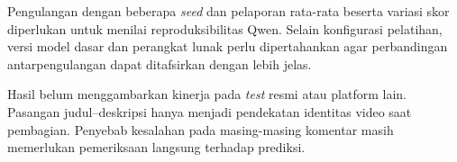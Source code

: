 \documentclass[11pt]{article}
\begin{document}
Pengulangan dengan beberapa \textit{seed} dan pelaporan rata-rata beserta variasi skor diperlukan untuk menilai reproduksibilitas Qwen. Selain konfigurasi pelatihan, versi model dasar dan perangkat lunak perlu dipertahankan agar perbandingan antarpengulangan dapat ditafsirkan dengan lebih jelas.

Hasil belum menggambarkan kinerja pada \textit{test} resmi atau platform lain. Pasangan judul--deskripsi hanya menjadi pendekatan identitas video saat pembagian. Penyebab kesalahan pada masing-masing komentar masih memerlukan pemeriksaan langsung terhadap prediksi.


\end{document}
